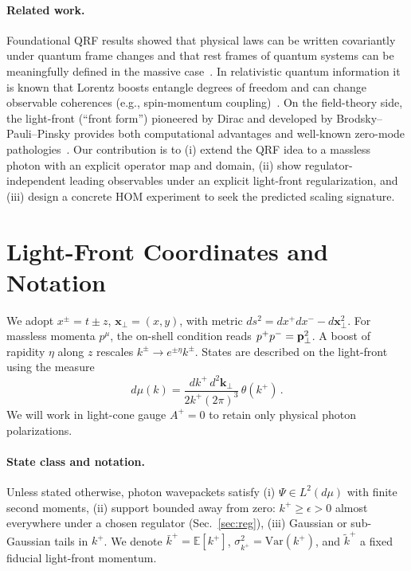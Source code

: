 \documentclass[aps,11pt]{article}
\newcommand{\Var}{\mathrm{Var}}
\newcommand{\E}{\mathbb{E}}
\newcommand{\kplus}{k^{+}}
\newcommand{\kperp}{\mathbf{k}_{\perp}}
\newcommand{\kbar}{\bar{k}^{+}}
\newcommand{\ktil}{\tilde{k}^{+}}
\begin{document}
\paragraph{Related work.}
Foundational QRF results showed that physical laws can be written covariantly under quantum frame changes and that rest frames of quantum systems can be meaningfully defined in the massive case~\cite{Giacomini2019,Vanrietvelde2020}. In relativistic quantum information it is known that Lorentz boosts entangle degrees of freedom and can change observable coherences (e.g., spin-momentum coupling)~\cite{PeresTerno2002,Streiter2021}. On the field-theory side, the light-front (``front form'') pioneered by Dirac and developed by Brodsky--Pauli--Pinsky provides both computational advantages and well-known zero-mode pathologies~\cite{Dirac1949,Brodsky1998}. Our contribution is to (i) extend the QRF idea to a massless photon with an explicit operator map and domain, (ii) show regulator-independent leading observables under an explicit light-front regularization, and (iii) design a concrete HOM experiment to seek the predicted scaling signature.

\section{Light-Front Coordinates and Notation}\label{sec:lightfront_primer}
We adopt \(x^\pm=t\pm z\), \(\mathbf{x}_\perp=(x,y)\), with metric \(ds^2=dx^+dx^--d\mathbf{x}_\perp^2\). For massless momenta \(p^\mu\), the on-shell condition reads \(p^+p^-=\vb{p}_\perp^2\). A boost of rapidity \(\eta\) along \(z\) rescales \(k^\pm\to e^{\pm\eta}k^\pm\). States are described on the light-front using the measure
\begin{equation}
d\mu(k)= \frac{d\kplus\, d^2\kperp}{2\kplus(2\pi)^3}\, \theta(\kplus)\,.
\end{equation}
We will work in light-cone gauge \(A^+=0\) to retain only physical photon polarizations.

\paragraph{State class and notation.}
Unless stated otherwise, photon wavepackets satisfy (i) \(\Psi\in L^2(d\mu)\) with finite second moments, (ii) support bounded away from zero: \(\kplus\ge \epsilon>0\) almost everywhere under a chosen regulator (Sec.~\ref{sec:reg}), (iii) Gaussian or sub-Gaussian tails in \(\kplus\). We denote \(\kbar=\E[\kplus]\), \(\sigma_{\kplus}^2=\Var(\kplus)\), and \(\ktil\) a fixed fiducial light-front momentum.
\end{document}
